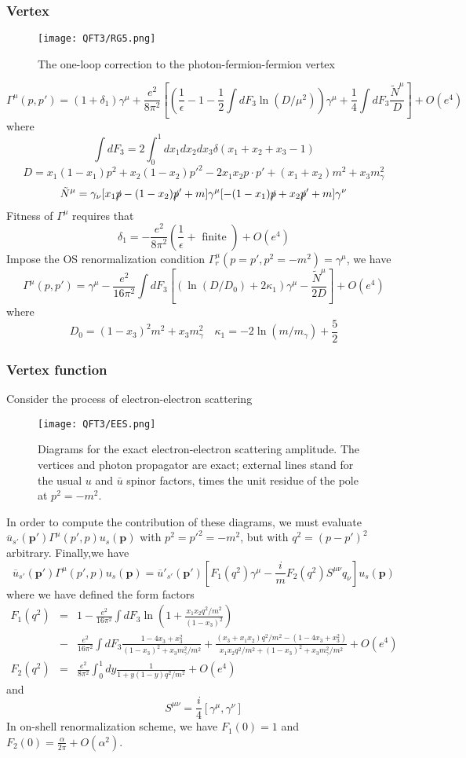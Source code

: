 \documentclass[cyan]{elegantnote}
\begin{document}
\subsubsection{Vertex}
\begin{figure}[!h]
\centering
\texttt{[image: QFT3/RG5.png]}
\caption{The one-loop correction to the photon-fermion-fermion vertex}
\end{figure}
\[\Gamma^{\mu}(p,p') = (1+\delta_1)\gamma^{\mu} + \frac{e^2}{8\pi^2} \left[\left(\frac{1}{\epsilon} - 1 - \frac{1}{2} \int dF_3 \ln (D/\mu^2)\right)\gamma^{\mu} + \frac{1}{4} \int dF_3 \frac{\tilde{N}^{\mu}}{D}\right] + O(e^4)\]
where
\[\int dF_3 = 2 \int_0^1 dx_1 dx_2 dx_3 \delta(x_1+x_2+x_3-1)\]
\[D = x_1(1-x_1)p^2 + x_2(1-x_2)p'^2 - 2x_1x_2p \cdot p' + (x_1+x_2)m^2 + x_3 m_{\gamma}^2\]
\[\tilde{N}^{\mu} = \gamma_{\nu}[x_1\slashed{p}-(1-x_2)\slashed{p}'+m]\gamma^{\mu}[-(1-x_1)\slashed{p}+x_2\slashed{p}'+m]\gamma^{\nu}\]
Fitness of $\Gamma^{\mu}$ requires that
\[\delta_1 = -  \frac{e^2}{8\pi^2}(\frac{1}{\epsilon}+\mbox{ finite }) + O(e^4)\]
Impose the OS renormalization condition $\Gamma^{\mu}_r(p=p',p^2=-m^2) = \gamma^{\mu}$, we have
\[\Gamma^{\mu}(p,p') = \gamma^{\mu} - \frac{e^2}{16\pi^2} \int dF_3 \left[\left(\ln (D/D_0)+2\kappa_1\right)\gamma^{\mu} - \frac{\tilde{N}^{\mu}}{2D}\right] + O(e^4)\]
where
\[D_0 = (1-x_3)^2m^2 + x_3 m_{\gamma}^2 \quad \kappa_1 = -2 \ln(m/m_{\gamma}) + \frac{5}{2}\]

\subsubsection{Vertex function}
Consider the process of electron-electron scattering
\begin{figure}[!h]
\centering
\texttt{[image: QFT3/EES.png]}
\caption{Diagrams for the exact electron-electron scattering amplitude. The vertices and photon propagator are exact; external lines stand for the usual $u$ and $\bar{u}$ spinor factors, times the unit residue of the pole at $p^2=-m^2$.}
\end{figure}
In order to compute the contribution of these diagrams, we must evaluate $\overline{u}_{s'}(\bm{p}')\Gamma^{\mu}(p',p)u_s(\bm{p})$ with $p^2 = p'^2 = -m^2$, but with $q^2 = (p-p')^2$ arbitrary. Finally,we have 
\[\overline{u}_{s'}(\bm{p}')\Gamma^{\mu}(p',p)u_s(\bm{p}) = \overline{u}'_{s'}(\bm{p}')\left[F_1(q^2)\gamma^{\mu} - \frac{i}{m}F_2(q^2)S^{\mu\nu}q_{\nu}\right]u_s(\bm{p})\]
where we have defined the form factors
\begin{eqnarray}
F_1(q^2) &=& 1 - \frac{e^2}{16\pi^2} \int dF_3  \ln \left ( 1 + \frac{x_1x_2q^2/m^2}{(1-x_3)^2}\right ) \nonumber \\
&-& \frac{e^2}{16\pi^2} \int dF_3 \frac{1-4x_3+x_3^2}{(1-x_3)^2+x_3m_{\gamma}^2/m^2} + \frac{(x_3+x_1x_2)q^2/m^2-(1-4x_3+x_3^2)}{x_1x_2q^2/m^2+(1-x_3)^2+x_3m_{\gamma}^2/m^2} + O(e^4) \nonumber \\
F_2(q^2) &=& \frac{e^2}{8\pi^2} \int_0^1 dy \frac{1}{1 + y(1-y)q^2/m^2} + O(e^4) \nonumber
\end{eqnarray}
and
\[S^{\mu\nu}= \frac{i}{4}[\gamma^{\mu},\gamma^{\nu}]\]
In on-shell renormalization scheme, we have $F_1(0) = 1$ and $F_2(0) = \frac{\alpha}{2\pi} + O(\alpha^2)$.
\end{document}

